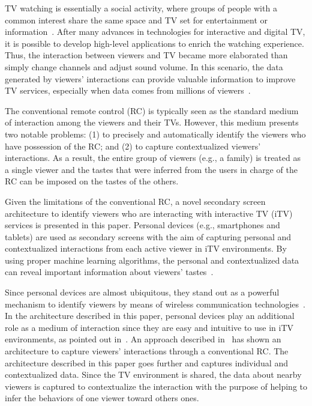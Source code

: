 \documentclass[journal]{IEEEtran}
\begin{document}
TV watching is essentially a social activity, where groups of people with a common interest share the same space and TV set for entertainment or information~\cite{Masthoff2004}. After many advances in technologies for interactive and digital TV, it is possible to develop high-level applications to enrich the watching experience. Thus, the interaction between viewers and TV became more elaborated than simply change channels and adjust sound volume. In this scenario, the data generated by viewers' interactions can provide valuable information to improve TV services, especially when data comes from millions of viewers~\cite{Teixeira2010}.

The conventional remote control (RC) is typically seen as the standard medium of interaction among the viewers and their TVs. However, this medium presents two notable problems: (1) to precisely and automatically identify the viewers who have possession of the RC; and (2) to capture contextualized viewers' interactions. As a result, the entire group of viewers (e.g., a family) is treated as a single viewer and the tastes that were inferred from the users in charge of the RC can be imposed on the tastes of the others.

Given the limitations of the conventional RC, a novel secondary screen architecture to identify viewers who are interacting with interactive TV (iTV) services is presented in this paper. Personal devices (e.g., smartphones and tablets) are used as secondary screens with the aim of capturing personal and contextualized interactions from each active viewer in iTV environments. By using proper machine learning algorithms, the personal and contextualized data can reveal important information about viewers' tastes~\cite{Kim2012,Shin2009}. 

Since personal devices are almost ubiquitous, they stand out as a powerful mechanism to identify viewers by means of wireless communication technologies~\cite{Cabarcos2011}. In the architecture described in this paper, personal devices play an additional role as a medium of interaction since they are easy and intuitive to use in iTV environments, as pointed out in~\cite{Courtois2012}. An approach described in~\cite{Teixeira2010} has shown an architecture to capture viewers' interactions through a conventional RC. The architecture described in this paper goes further and captures individual and contextualized data. Since the TV environment is shared, the data about nearby viewers is captured to contextualize the interaction with the purpose of helping to infer the behaviors of one viewer toward others ones.
\end{document}
